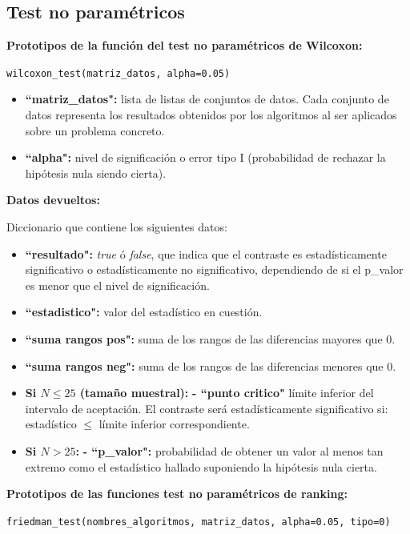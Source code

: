\subsection{Test no paramétricos}

\noindent
\textbf{Prototipos de la función del test no paramétricos de Wilcoxon:}

\texttt{wilcoxon\_test(matriz\_datos, alpha=0.05)}

\begin{itemize}
\item \textbf{``matriz\_datos":} lista de listas de conjuntos de datos. Cada conjunto de datos representa los resultados obtenidos por los algoritmos al ser aplicados sobre un problema concreto.
\item \textbf{``alpha":} nivel de significación o error tipo I (probabilidad de rechazar la hipótesis nula siendo cierta).
\end{itemize}

\noindent
\textbf{Datos devueltos:}

Diccionario que contiene los siguientes datos:

\begin{itemize}
\item \textbf{``resultado":} \textit{true} ó \textit{false}, que indica que el contraste es estadísticamente significativo o estadísticamente no significativo, dependiendo de si el p\_valor es menor que el nivel de significación.
\item \textbf{``estadistico":} valor del estadístico en cuestión.
\item \textbf{``suma rangos pos":} suma de los rangos de las diferencias mayores que 0.
\item \textbf{``suma rangos neg":} suma de los rangos de las diferencias menores que 0.
\item \textbf{Si $N \leq 25$ (tamaño muestral):}
\subitem \textbf{- ``punto critico"} límite inferior del intervalo de aceptación. El contraste será estadísticamente significativo si: estadístico $\leq$ límite inferior correspondiente.
\item \textbf{Si $N > 25$:}
\subitem \textbf{- ``p\_valor":} probabilidad de obtener un valor al menos tan extremo como el estadístico hallado suponiendo la hipótesis nula cierta.
\end{itemize}

\noindent
\textbf{Prototipos de las funciones test no paramétricos de ranking:}

\texttt{friedman\_test(nombres\_algoritmos, matriz\_datos, alpha=0.05, tipo=0)}

